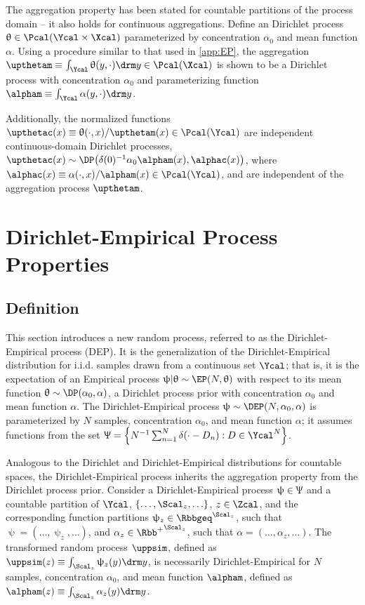 \documentclass[12pt]{report}
\begin{document}
The aggregation property has been stated for countable partitions of the process domain -- it also holds for continuous aggregations. Define an Dirichlet process $\uptheta \in \Pcal(\Ycal \times \Xcal)$ parameterized by concentration $\alpha_0$ and mean function $\alpha$. Using a procedure similar to that used in \cref{app:EP}, the aggregation $\upthetam \equiv \int_{\Ycal} \uptheta(y,\cdot) {\drm}y \in \Pcal(\Xcal)$ is shown to be a Dirichlet process with concentration $\alpha_0$ and parameterizing function $\alpham \equiv \int_{\Ycal} \alpha(y,\cdot) {\drm}y$. 

Additionally, the normalized functions $\upthetac(x) \equiv \uptheta(\cdot,x) / \upthetam(x) \in \Pcal(\Ycal)$ are independent continuous-domain Dirichlet processes, $\upthetac(x) \sim \DP\big(\delta(0) ^{-1} \alpha_0 \alpham(x), \alphac(x)\big)$, where $\alphac(x) \equiv \alpha(\cdot,x) / \alpham(x) \in \Pcal(\Ycal)$, and are independent of the aggregation process $\upthetam$.









\section{Dirichlet-Empirical Process Properties} \label{app:DEP}


\subsection{Definition}

This section introduces a new random process, referred to as the Dirichlet-Empirical process (DEP). It is the generalization of the Dirichlet-Empirical distribution for i.i.d. samples drawn from a continuous set $\Ycal$; that is, it is the expectation of an Empirical process $\uppsi | \uptheta \sim \EP(N,\uptheta)$ with respect to its mean function $\uptheta \sim \DP(\alpha_0,\alpha)$, a Dirichlet process prior with concentration $\alpha_0$ and mean function $\alpha$. The Dirichlet-Empirical process $\uppsi \sim \DEP(N,\alpha_0,\alpha)$ is parameterized by $N$ samples, concentration $\alpha_0$, and mean function $\alpha$; it assumes functions from the set $\Uppsi = \left\{ N^{-1} \sum_{n=1}^N \delta(\cdot - D_n) : D \in \Ycal^N \right\}$.

Analogous to the Dirichlet and Dirichlet-Empirical distributions for countable spaces, the Dirichlet-Empirical process inherits the aggregation property from the Dirichlet process prior. Consider a Dirichlet-Empirical process $\uppsi \in \Uppsi$ and a countable partition of $\Ycal$, $\left\{ \ldots,\Scal_z,\ldots \right\}$, $z \in \Zcal$, and the corresponding function partitions $\uppsi_z \in \Rbbgeq^{\Scal_z}$, such that $\uppsi = \left( \ldots,\uppsi_z,\ldots \right)$, and $\alpha_z \in {\Rbb^+}^{\Scal_z}$, such that $\alpha = \left( \ldots,\alpha_z,\ldots \right)$. The transformed random process $\uppsim$, defined as $\uppsim(z) \equiv \int_{\Scal_z} \uppsi_z(y) {\drm}y$, is necessarily Dirichlet-Empirical for $N$ samples, concentration $\alpha_0$, and mean function $\alpham$, defined as $\alpham(z) \equiv \int_{\Scal_z} \alpha_z(y) {\drm}y$.
\end{document}
